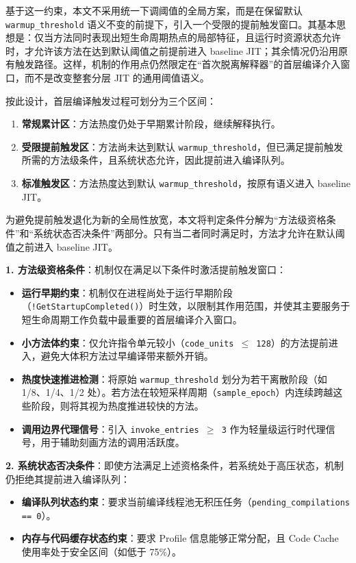 基于这一约束，本文不采用统一下调阈值的全局方案，而是在保留默认 \texttt{warmup\_threshold} 语义不变的前提下，引入一个受限的提前触发窗口。其基本思想是：仅当方法同时表现出短生命周期热点的局部特征，且运行时资源状态允许时，才允许该方法在达到默认阈值之前提前进入 baseline JIT；其余情况仍沿用原有触发路径。这样，机制的作用点仍然限定在“首次脱离解释器”的首层编译介入窗口，而不是改变整套分层 JIT 的通用阈值语义。

按此设计，首层编译触发过程可划分为三个区间：
\begin{enumerate}
    \item \textbf{常规累计区}：方法热度仍处于早期累计阶段，继续解释执行。
    \item \textbf{受限提前触发区}：方法尚未达到默认 \texttt{warmup\_threshold}，但已满足提前触发所需的方法级条件，且系统状态允许，因此提前进入编译队列。
    \item \textbf{标准触发区}：方法热度达到默认 \texttt{warmup\_threshold}，按原有语义进入 baseline JIT。
\end{enumerate}

为避免提前触发退化为新的全局性放宽，本文将判定条件分解为“方法级资格条件”和“系统状态否决条件”两部分。只有当二者同时满足时，方法才允许在默认阈值之前进入 baseline JIT。

\textbf{1. 方法级资格条件}：机制仅在满足以下条件时激活提前触发窗口：
\begin{itemize}
    \item \textbf{运行早期约束}：机制仅在进程尚处于运行早期阶段（\texttt{!GetStartupCompleted()}）时生效，以限制其作用范围，并使其主要服务于短生命周期工作负载中最重要的首层编译介入窗口。
    \item \textbf{小方法体约束}：仅允许指令单元较小（\texttt{code\_units $\le$ 128}）的方法提前进入，避免大体积方法过早编译带来额外开销。
    \item \textbf{热度快速推进检测}：将原始 \texttt{warmup\_threshold} 划分为若干离散阶段（如 1/8、1/4、1/2 处）。若方法在较短采样周期（\texttt{sample\_epoch}）内连续跨越这些阶段，则将其视为热度推进较快的方法。
    \item \textbf{调用边界代理信号}：引入 \texttt{invoke\_entries $\ge$ 3} 作为轻量级运行时代理信号，用于辅助刻画方法的调用活跃度。
\end{itemize}

\textbf{2. 系统状态否决条件}：即使方法满足上述资格条件，若系统处于高压状态，机制仍拒绝其提前进入编译队列：
\begin{itemize}
    \item \textbf{编译队列状态约束}：要求当前编译线程池无积压任务（\texttt{pending\_compilations == 0}）。
    \item \textbf{内存与代码缓存状态约束}：要求 Profile 信息能够正常分配，且 Code Cache 使用率处于安全区间（如低于 75\%）。
\end{itemize}

